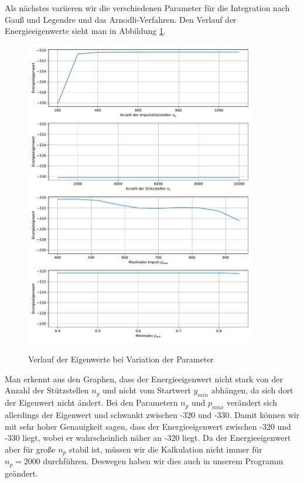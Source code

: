 \documentclass[11pt,a4paper]{article}
\begin{document}
Als nächstes variieren wir die verschiedenen Parameter für die Integration nach Gauß und Legendre und das Arnodli-Verfahren. Den Verlauf der Energieeigenwerte sieht man in Abbildung \ref{fig:lennard_jones_eigenvals}.
\begin{figure}
	\includegraphics[width=0.9\textwidth]{lj_variation_params}\label{fig:lennard_jones_eigenvals}
	\caption{Verlauf der Eigenwerte bei Variation der Parameter}
\end{figure}
Man erkennt aus den Graphen, dass der Energieeigenwert nicht stark von der Anzahl der Stützstellen $n_y$ und nicht vom Startwert $y_{min}$ abhängen, da sich dort der Eigenwert nicht ändert.
Bei den Parametern $n_p$ und $p_{max}$ verändert sich allerdings der Eigenwert und schwankt zwischen -320 und -330. Damit können wir mit sehr hoher Genauigkeit sagen, dass der Energieeigenwert zwischen -320 und -330 liegt, wobei er wahrscheinlich näher an -320 liegt. Da der Energieeigenwert aber für große $n_p$ stabil ist, müssen wir die Kalkulation nicht immer für $n_p=2000$ durchführen. Deswegen haben wir dies auch in unserem Programm geändert.
\end{document}

